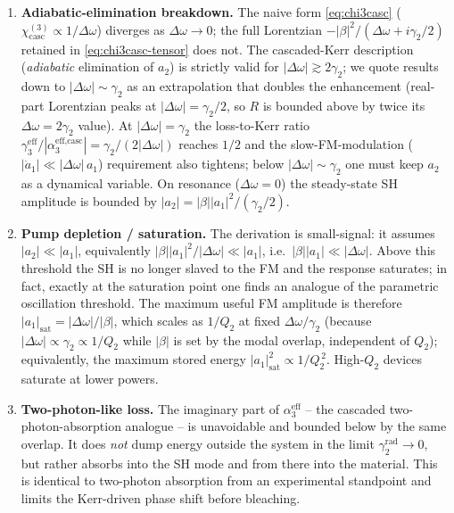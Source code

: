 \documentclass[11pt,a4paper]{article}
\newcommand{\chithree}{\chi^{(3)}}
\newcommand{\Dom}{\Delta\omega}
\begin{document}
\begin{enumerate}
  \item \textbf{Adiabatic-elimination breakdown.} The naive form
        \eqref{eq:chi3casc} ($\chithree_\text{casc}\propto 1/\Dom$)
        diverges as $\Dom\to 0$; the full Lorentzian
        $-|\beta|^2/(\Dom+i\gamma_2/2)$ retained in
        \eqref{eq:chi3casc-tensor} does not.  The cascaded-Kerr
        description (\emph{adiabatic} elimination of $a_2$) is strictly
        valid for $|\Dom|\gtrsim 2\gamma_2$; we quote results down to
        $|\Dom|\sim\gamma_2$ as an extrapolation that doubles the
        enhancement (real-part Lorentzian peaks at $|\Dom|=\gamma_2/2$,
        so $R$ is bounded above by twice its $\Dom=2\gamma_2$ value).
        At $|\Dom|=\gamma_2$ the loss-to-Kerr ratio
        $\gamma_3^\text{eff}/|\alpha_3^\text{eff,casc}|=\gamma_2/(2|\Dom|)$
        reaches $1/2$ and the slow-FM-modulation
        ($|\dot a_1|\ll|\Dom|\,a_1$) requirement also tightens; below
        $|\Dom|\!\sim\!\gamma_2$ one must keep $a_2$ as a dynamical
        variable.  On resonance ($\Dom=0$) the steady-state SH amplitude
        is bounded by $|a_2|=|\beta||a_1|^{2}/(\gamma_2/2)$.

  \item \textbf{Pump depletion / saturation.} The derivation is
        small-signal: it assumes $|a_2|\ll|a_1|$, equivalently
        $|\beta||a_1|^{2}/|\Dom|\ll|a_1|$, i.e.\
        $|\beta||a_1|\ll|\Dom|$.  Above this threshold the SH is no
        longer slaved to the FM and the response saturates; in fact,
        exactly at the saturation point one finds an analogue of the
        parametric oscillation threshold.  The maximum useful FM
        amplitude is therefore $|a_1|_\text{sat}=|\Dom|/|\beta|$,
        which scales as $1/Q_2$ at fixed $\Dom/\gamma_2$ (because
        $|\Dom|\propto\gamma_2\propto 1/Q_2$ while $|\beta|$ is set
        by the modal overlap, independent of $Q_2$); equivalently,
        the maximum stored energy $|a_1|^{2}_\text{sat}\propto
        1/Q_2^{\,2}$.  High-$Q_2$ devices saturate at lower
        powers.

  \item \textbf{Two-photon-like loss.} The imaginary part of
        $\alpha_3^\text{eff}$ -- the cascaded two-photon-absorption
        analogue -- is unavoidable and bounded below by the same
        overlap.  It does \emph{not} dump energy outside the system in
        the limit $\gamma_2^\text{rad}\to 0$, but rather absorbs into
        the SH mode and from there into the material.  This is
        identical to two-photon absorption from an experimental
        standpoint and limits the Kerr-driven phase shift before
        bleaching.


\end{enumerate}
\end{document}

